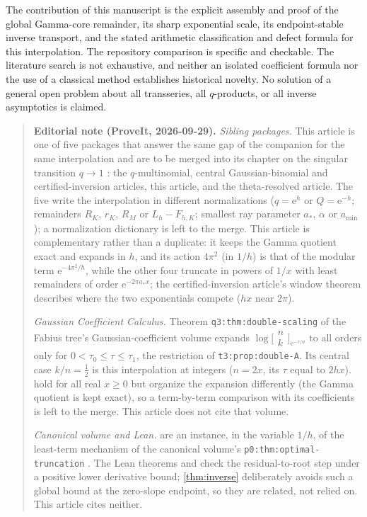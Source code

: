 \documentclass[11pt,a4paper]{article}
\numberwithin{equation}{section}
\theoremstyle{definition}
\newcommand{\ee}{\mathrm e}
\begin{document}
The contribution of this manuscript is the explicit assembly and proof of the global Gamma-core remainder, its sharp exponential scale, its endpoint-stable inverse transport, and the stated arithmetic classification and defect formula for this interpolation. The repository comparison is specific and checkable. The literature search is not exhaustive, and neither an isolated coefficient formula nor the use of a classical method establishes historical novelty. No solution of a general open problem about all transseries, all $q$-products, or all inverse asymptotics is claimed.

\begin{quote}\small
\textbf{Editorial note (ProveIt, 2026-09-29).}
\emph{Sibling packages.} This article is one of five packages that answer
the same gap of the companion for the same interpolation and are to be merged
into its chapter on the singular transition $q\to1$ \cite{ed:siblings}: the
$q$-multinomial, central Gaussian-binomial and certified-inversion articles,
this article, and the theta-resolved article. The five write the interpolation in different normalizations ($q=\ee^h$ or $Q=\ee^{-h}$; remainders $R_K$, $r_K$, $R_M$ or $L_h-F_{h,K}$; smallest ray parameter $a_*$, $\alpha$ or $a_{\min}$); a normalization dictionary is left to the merge.
This article is complementary rather than a duplicate: it keeps the Gamma
quotient exact and expands in $h$, and its action $4\pi^2$ (in $1/h$) is
that of the modular term $\ee^{-4\pi^2/h}$, while the other four truncate in
powers of $1/x$ with least remainders of order $\ee^{-2\pi a_*x}$; the
certified-inversion article's window theorem describes where the two
exponentials compete ($hx$ near $2\pi$).

\emph{Gaussian Coefficient Calculus.} Theorem \texttt{q3:thm:double-scaling}
of the Fabius tree's Gaussian-coefficient volume \cite{ed:gcc} expands
$\log\bigl[\begin{smallmatrix}n\\k\end{smallmatrix}\bigr]_{\ee^{-\tau/n}}$
to all orders only for $0<\tau_0\le\tau\le\tau_1$, the restriction of
\texttt{t3:prop:double-A}. Its central case $k/n=\frac12$ is this
interpolation at integers ($n=2x$, its $\tau$ equal to $2hx$).
 hold for all real $x\ge0$ but organize the
expansion differently (the Gamma quotient is kept exact), so a term-by-term
comparison with its coefficients is left to the merge. This article does
not cite that volume.

\emph{Canonical volume and Lean.}  are an
instance, in the variable $1/h$, of the least-term mechanism of the
canonical volume's \texttt{p0:thm:optimal-truncation} \cite{ed:tai}. The
Lean theorems  and
 \cite{ed:lean} check the residual-to-root step
under a positive lower derivative bound; \cref{thm:inverse} deliberately
avoids such a global bound at the zero-slope endpoint, so they are related,
not relied on. This article cites neither.
\end{quote}
\end{document}
